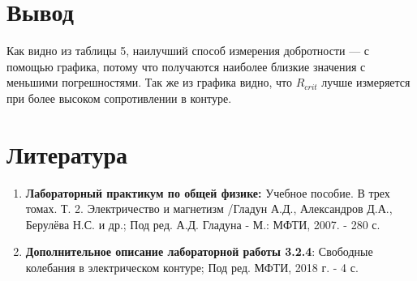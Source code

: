 \documentclass[a4paper, 12pt]{article}%
\begin{document}
\newpage

\section{Вывод}
Как видно из таблицы 5, наилучший способ измерения добротности --- с помощью графика, потому что получаются наиболее близкие значения с меньшими погрешностями. Так же из графика видно, что $R_{crit}$ лучше измеряется при более высоком сопротивлении в контуре. 

\section{Литература}
\begin{enumerate}
\item \textbf{Лабораторный практикум по общей физике:} Учебное пособие. В трех томах. Т. 2. Электричество и магнетизм /Гладун А.Д., Александров Д.А., Берулёва Н.С. и др.; Под ред. А.Д. Гладуна - М.: МФТИ, 2007. - 280 с.
\item \textbf{Дополнительное описание лабораторной работы 3.2.4}: Свободные колебания в электрическом контуре; Под ред. МФТИ, 2018 г. - 4 с.
\end{enumerate}

					
\end{document}
